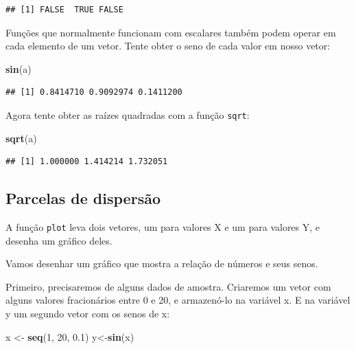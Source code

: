 \documentclass[
]{book}
\newenvironment{Shaded}{\begin{snugshade}}{\end{snugshade}}
\newcommand{\DecValTok}[1]{\textcolor[rgb]{0.00,0.00,0.81}{#1}}
\newcommand{\FloatTok}[1]{\textcolor[rgb]{0.00,0.00,0.81}{#1}}
\newcommand{\KeywordTok}[1]{\textcolor[rgb]{0.13,0.29,0.53}{\textbf{#1}}}
\newcommand{\NormalTok}[1]{#1}
\newcommand{\StringTok}[1]{\textcolor[rgb]{0.31,0.60,0.02}{#1}}
\begin{document}
\begin{verbatim}
## [1] FALSE  TRUE FALSE
\end{verbatim}

Funções que normalmente funcionam com escalares também podem operar em cada elemento de um vetor. Tente obter o seno de cada valor em nosso vetor:

\begin{Shaded}
\begin{Highlighting}[]
\KeywordTok{sin}\NormalTok{(a)}
\end{Highlighting}
\end{Shaded}

\begin{verbatim}
## [1] 0.8414710 0.9092974 0.1411200
\end{verbatim}

Agora tente obter as raízes quadradas com a função \texttt{sqrt}:

\begin{Shaded}
\begin{Highlighting}[]
\KeywordTok{sqrt}\NormalTok{(a)}
\end{Highlighting}
\end{Shaded}

\begin{verbatim}
## [1] 1.000000 1.414214 1.732051
\end{verbatim}

\hypertarget{parcelas-de-dispersuxe3o}{%
\subsection{Parcelas de dispersão}\label{parcelas-de-dispersuxe3o}}

A função \texttt{plot} leva dois vetores, um para valores X e um para valores Y, e desenha um gráfico deles.

Vamos desenhar um gráfico que mostra a relação de números e seus senos.

Primeiro, precisaremos de alguns dados de amostra. Criaremos um vetor com alguns valores fracionários entre 0 e 20, e armazenó-lo na variável x. E na variável y um segundo vetor com os senos de x:

\begin{Shaded}
\begin{Highlighting}[]
\NormalTok{x <-}\StringTok{ }\KeywordTok{seq}\NormalTok{(}\DecValTok{1}\NormalTok{, }\DecValTok{20}\NormalTok{, }\FloatTok{0.1}\NormalTok{)}
\NormalTok{y<-}\KeywordTok{sin}\NormalTok{(x)}
\end{Highlighting}
\end{Shaded}
\end{document}
